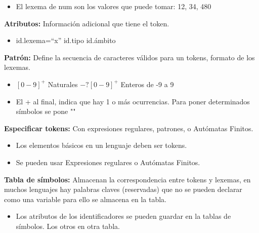 \documentclass[12pt]{report} %
\begin{document}
\begin{itemize}

\item
  El lexema de num son los valores que puede tomar: 12, 34, 480
\end{itemize}

\textbf{Atributos:} Información adicional que tiene el token.

\begin{itemize}

\item
  id.lexema=``x'' id.tipo id.ámbito
\end{itemize}

\textbf{Patrón:} Define la secuencia de caracteres válidos para un
tokens, formato de los lexemas.

\begin{itemize}
\item
  \([0-9]^+\) Naturales \(-?[0-9]^+\) Enteros de -9 a 9
\item
  El + al final, indica que hay 1 o más ocurrencias. Para poner
  determinados símbolos se pone ""
\end{itemize}

\textbf{Especificar tokens:} Con expresiones regulares, patrones, o
Autómatas Finitos.

\begin{itemize}
\item
  Los elementos básicos en un lenguaje deben ser tokens.
\item
  Se pueden usar Expresiones regulares o Autómatas Finitos.
\end{itemize}

\textbf{Tabla de símbolos:} Almacenan la correspondencia entre tokens y
lexemas, en muchos lenguajes hay palabras claves (reservadas) que no se
pueden declarar como una variable para ello se almacena en la tabla.

\begin{itemize}

\item
  Los atributos de los identificadores se pueden guardar en la tablas de
  símbolos. Los otros en otra tabla.
\end{itemize}
\end{document}

